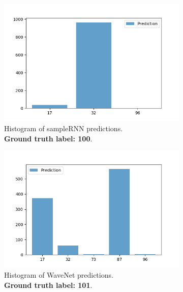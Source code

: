 \begin{figure}[t]
    \centering
    \begin{subfigure}[b]{0.45\linewidth}
        \includegraphics[width=\textwidth]{./fig/pred_histogram_cathy.png}
        \caption{Histogram of sampleRNN predictions.\\\textbf{Ground truth label: 100}.}
        \label{fig:pred_sampleRNN}
    \end{subfigure}  
    \begin{subfigure}[b]{0.45\linewidth}
        \includegraphics[width=\textwidth]{./fig/pred_histogram_p280.png}
        \caption{Histogram of WaveNet predictions.\\\textbf{Ground truth label: 101}.}
        \label{fig:pred_wavenet}
    \end{subfigure}
    \begin{subfigure}[b]{0.5\linewidth}

\end{subfigure}
\end{figure}
